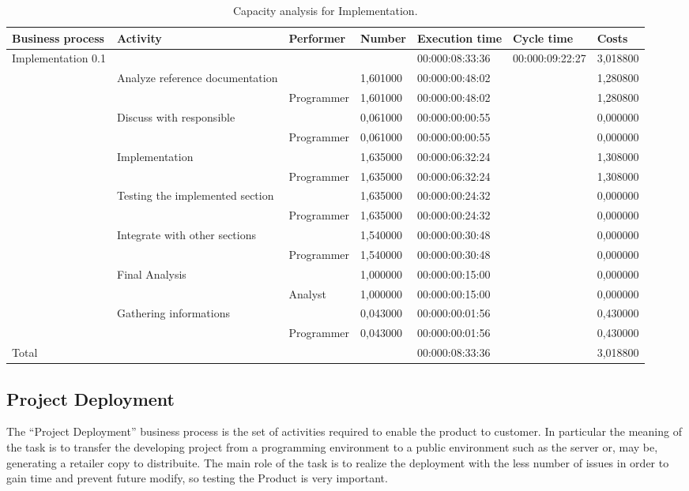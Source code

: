 \begin{landscape}
\begin{table}
\centering
{\tiny
\begin{tabular}{|l|l|l|l|l|l|l|}
Business process&Activity&Performer&Number&Execution time&Cycle time&Costs\\
\hline
Implementation 0.1&&&&00:000:08:33:36&00:000:09:22:27&3,018800\\
\hline
&Analyze reference documentation &&1,601000&00:000:00:48:02&&1,280800\\
\hline
&&Programmer &1,601000&00:000:00:48:02&&1,280800\\
\hline
&Discuss with responsible &&0,061000&00:000:00:00:55&&0,000000\\
\hline
&&Programmer &0,061000&00:000:00:00:55&&0,000000\\
\hline
&Implementation &&1,635000&00:000:06:32:24&&1,308000\\
\hline
&&Programmer &1,635000&00:000:06:32:24&&1,308000\\
\hline
&Testing the implemented section &&1,635000&00:000:00:24:32&&0,000000\\
\hline
&&Programmer &1,635000&00:000:00:24:32&&0,000000\\
\hline
&Integrate with other sections &&1,540000&00:000:00:30:48&&0,000000\\
\hline
&&Programmer &1,540000&00:000:00:30:48&&0,000000\\
\hline
&Final Analysis &&1,000000&00:000:00:15:00&&0,000000\\
\hline
&&Analyst &1,000000&00:000:00:15:00&&0,000000\\
\hline
&Gathering informations &&0,043000&00:000:00:01:56&&0,430000\\
\hline
&&Programmer &0,043000&00:000:00:01:56&&0,430000\\
\hline
Total&&&&00:000:08:33:36&&3,018800
\end{tabular}
}
\caption{Capacity analysis for Implementation.}
\end{table}
\end{landscape}
%

%

\subsection{Project Deployment}
The ``Project Deployment'' business process is the set of activities required to enable the product to customer. In particular the meaning of the task is to transfer the developing project from a programming environment to a public environment such as the server or, may be, generating a retailer copy to distribuite. The main role of the task is to realize the deployment with the less number of issues in order to gain time and prevent future modify, so testing the Product is very important.

